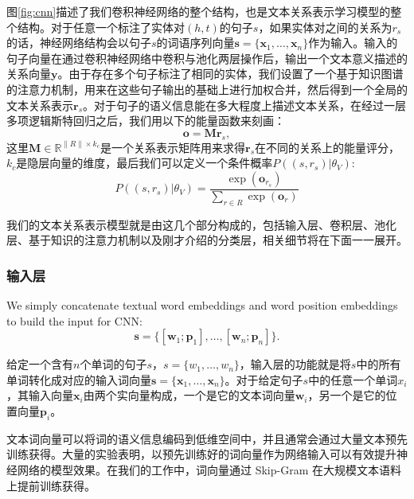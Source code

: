 图\ref{fig:cnn}描述了我们卷积神经网络的整个结构，也是文本关系表示学习模型的整个结构。对于任意一个标注了实体对$(h, t)$的句子$s$，如果实体对之间的关系为$r_s$的话，神经网络结构会以句子$s$的词语序列向量$\mathbf{s} = \{\mathbf{x}_1, \ldots, \mathbf{x}_n \}$作为输入。输入的句子向量在通过卷积神经网络中卷积与池化两层操作后，输出一个文本意义描述的关系向量$\mathbf{y}$。由于存在多个句子标注了相同的实体，我们设置了一个基于知识图谱的注意力机制，用来在这些句子输出的基础上进行加权合并，然后得到一个全局的文本关系表示$\mathbf{r}_s$。对于句子的语义信息能在多大程度上描述文本关系，在经过一层多项逻辑斯特回归之后，我们用以下的能量函数来刻画：
\begin{equation}
\mathbf{o} = \mathbf{M}\mathbf{r}_s,
\label{eq:cnn_distance}
\end{equation}
这里$\mathbf{M} \in \mathbb{R}^{\|R\| \times k_c} $是一个关系表示矩阵用来求得$\mathbf{r}_s$在不同的关系上的能量评分，$k_c$是隐层向量的维度，最后我们可以定义一个条件概率$P((s, r_s)|{\theta_V})$:
\begin{equation}
P((s, r_s)|{\theta_V}) = \frac{\exp(\mathbf{o}_{r_s})}{\sum_{r \in R} \exp(\mathbf{o}_{r})}
\label{eq:cnn_distance1}
\end{equation}

我们的文本关系表示模型就是由这几个部分构成的，包括输入层、卷积层、池化层、基于知识的注意力机制以及刚才介绍的分类层，相关细节将在下面一一展开。


\subsubsection{输入层}
 


We simply concatenate textual word embeddings and word position embeddings to build the input for CNN:
\begin{equation}
\mathbf{s} = \{[\mathbf{w}_1;\mathbf{p}_1],\ldots, [\mathbf{w}_n;\mathbf{p}_n]\}.
\end{equation}



给定一个含有$n$个单词的句子$s$，$s = \{ w_1, \ldots , w_n\}$，输入层的功能就是将$s$中的所有单词转化成对应的输入词向量$\mathbf{s} = \{ \mathbf{x}_1, \ldots , \mathbf{x}_n \}$。对于给定句子$s$中的任意一个单词$x_i$，其输入向量$\mathbf{x}_i$由两个实向量构成，一个是它的文本词向量$\mathbf{w}_i$，另一个是它的位置向量$\mathbf{p}_{i}$。

文本词向量可以将词的语义信息编码到低维空间中，并且通常会通过大量文本预先训练获得。大量的实验表明，以预先训练好的词向量作为网络输入可以有效提升神经网络的模型效果。在我们的工作中，词向量通过 Skip-Gram \cite{mikolov2013efficient}在大规模文本语料上提前训练获得。

